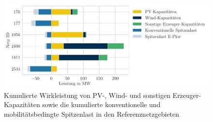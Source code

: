\begin{figure}[H]
    \centering
    \includegraphics[width=\textwidth]{Bilder/Installed_cap_peak_load_representatives}
    \caption{Kumulierte Wirkleistung von PV-, Wind- und sonstigen Erzeuger-Kapazitäten sowie die kumulierte konventionelle und mobilitätsbedingte Spitzenlast in den Referenznetzgebieten}\label{fig:bar_representatives}
\end{figure}